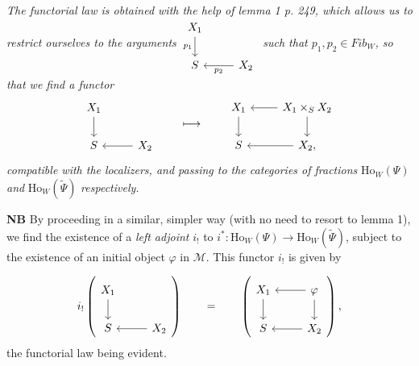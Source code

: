 \documentclass[11pt]{article}
\newcommand{\printedpage}[1]{\marginpar{\footnotesize p.~#1}}
\newcommand{\msp}[1]{\marginpar{\footnotesize [#1]}}
\newcommand{\Ho}{\mathrm{Ho}}
\begin{document}
\printedpage{165}

\textit{The functorial law is obtained with the help of lemma 1 p. 249, which allows us to restrict ourselves to the arguments $\begin{tikzcd}[ampersand replacement=\&] X_1 \arrow[d, "p_1"'] \& \\ S \& X_2 \arrow[l, "p_2"] \end{tikzcd}$ such that $p_1,p_2\in \mathit{Fib}_W$, so that we find a functor}
\[
\begin{tikzcd}[ampersand replacement=\&]
X_1 \arrow[d] \& \\
S \& X_2 \arrow[l]
\end{tikzcd}
\qquad\longmapsto\qquad
\begin{tikzcd}[ampersand replacement=\&]
X_1 \arrow[d] \& X_1\times_S X_2 \arrow[l] \arrow[d] \\
S \& X_2, \arrow[l]
\end{tikzcd}
\]
\textit{compatible with the localizers, and passing to the categories of fractions} $\Ho_W(\Psi)$ \textit{and} $\Ho_W(\tilde{\Psi})$ \textit{respectively.}

\textbf{NB} By proceeding in a similar, simpler way (with no need to resort to lemma 1), we find the existence of a \textit{left adjoint} $i_!$ to $i^* : \Ho_W(\Psi)\longrightarrow \Ho_W(\tilde{\Psi})$, subject to the existence of an initial object $\varphi$ in $\mathcal{M}$. This functor $i_!$ is given by %

\msp{page 255}
\[
i_!\left(
\begin{tikzcd}[ampersand replacement=\&]
X_1 \arrow[d] \& \\
S \& X_2 \arrow[l]
\end{tikzcd}
\right)
\qquad = \qquad
\left(
\begin{tikzcd}[ampersand replacement=\&]
X_1 \arrow[d] \& \varphi \arrow[l] \arrow[d] \\
S \& X_2 \arrow[l]
\end{tikzcd}
\right),
\]
the functorial law being evident.
\end{document}
